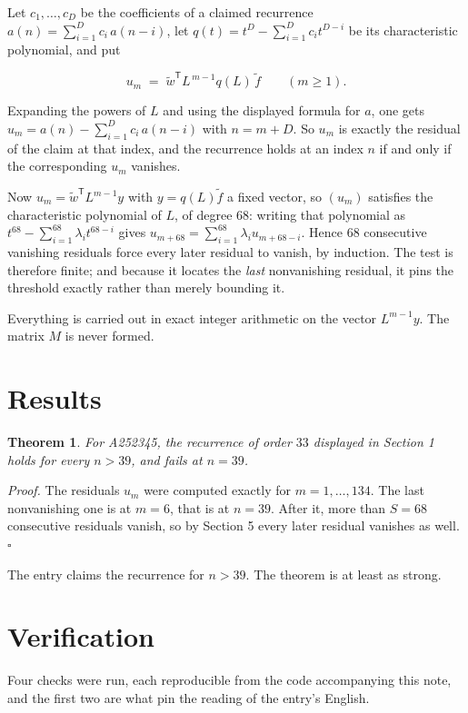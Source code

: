 \documentclass[11pt]{article}
\newtheorem{theorem}{Theorem}
\theoremstyle{definition}
\begin{document}
Let $c_1,\dots,c_D$ be the coefficients of a claimed recurrence $a(n) = \sum_{i=1}^{D} c_i\,a(n-i)$, let $q(t) = t^{D} - \sum_{i=1}^{D} c_i t^{D-i}$ be its characteristic polynomial, and put

\[u_m \;=\; \tilde w^{\mathsf T} L^{\,m-1} q(L)\,\tilde f \qquad (m \ge 1).\]

Expanding the powers of $L$ and using the displayed formula for $a$, one gets $u_m = a(n) - \sum_{i=1}^{D} c_i\,a(n-i)$ with $n = m + D$. So $u_m$ is exactly the residual of the claim at that index, and the recurrence holds at an index $n$ if and only if the corresponding $u_m$ vanishes.

Now $u_m = \tilde w^{\mathsf T} L^{m-1} y$ with $y = q(L)\tilde f$ a fixed vector, so $(u_m)$ satisfies the characteristic polynomial of $L$, of degree $68$: writing that polynomial as $t^{68} - \sum_{i=1}^{68} \lambda_i t^{68-i}$ gives $u_{m+68} = \sum_{i=1}^{68} \lambda_i u_{m+68-i}$. Hence $68$ consecutive vanishing residuals force every later residual to vanish, by induction. The test is therefore finite; and because it locates the {\itshape last} nonvanishing residual, it pins the threshold exactly rather than merely bounding it.

Everything is carried out in exact integer arithmetic on the vector $L^{m-1}y$. The matrix $M$ is never formed.

\section{Results}

\begin{theorem} For A252345, the recurrence of order $33$ displayed in Section 1 holds for every $n > 39$, and fails at $n = 39$.\end{theorem}

{\itshape Proof.} The residuals $u_m$ were computed exactly for $m = 1,\dots,134$. The last nonvanishing one is at $m = 6$, that is at $n = 39$. After it, more than $S = 68$ consecutive residuals vanish, so by Section 5 every later residual vanishes as well. $\square$

The entry claims the recurrence for $n > 39$. The theorem is at least as strong.

\section{Verification}

Four checks were run, each reproducible from the code accompanying this note, and the first two are what pin the reading of the entry's English.
\end{document}
